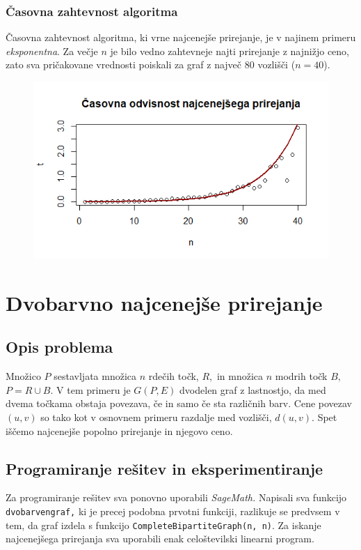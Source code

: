\documentclass[a4paper, 11pt]{article}
\begin{document}
\subsubsection*{Časovna zahtevnost algoritma}
Časovna zahtevnost algoritma, ki vrne najcenejše prirejanje, je v najinem primeru \emph{eksponentna}.
Za večje $n$ je bilo vedno zahtevneje najti prirejanje z najnižjo ceno, zato sva pričakovane vrednosti poiskali za graf z največ $80$ vozlišči ($n=40$).

\begin{figure}[h!]
    \includegraphics[scale=0.7]{cas_odv_polni}
    \centering
\end{figure}

\section{Dvobarvno najcenejše prirejanje}
\subsection{Opis problema}
Množico $P$ sestavljata množica $n$ rdečih točk, $R,$ in množica $n$ modrih točk $B,$ $P=R \cup B.$
V tem primeru je $G(P,E)$ dvodelen graf z lastnostjo, da med dvema točkama obstaja povezava, če in samo če sta različnih barv.
Cene povezav $(u,v)$ so tako kot v osnovnem primeru razdalje med vozlišči, $d(u,v).$
Spet iščemo najcenejše popolno prirejanje in njegovo ceno.

\subsection{Programiranje rešitev in eksperimentiranje}
Za programiranje rešitev sva ponovno uporabili \emph{SageMath.} Napisali sva funkcijo \texttt{dvobarven\underline{\space}graf,} ki je precej podobna prvotni funkciji,
razlikuje se predvsem v tem, da graf izdela s funkcijo \texttt{CompleteBipartiteGraph(n, n)}.
Za iskanje najcenejšega prirejanja sva uporabili enak celoštevilski linearni program.
\end{document}
